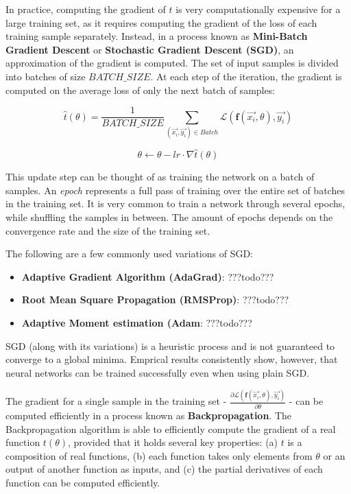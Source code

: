 In practice, computing the gradient of $t$ is very computationally expensive for a large training set, as it requires computing the gradient of the loss of each training sample separately. Instead, in a process known as \textbf{Mini-Batch Gradient Descent} or \textbf{Stochastic Gradient Descent (SGD)}, an approximation of the gradient is computed. The set of input samples is divided into batches of size $BATCH\_SIZE$. At each step of the iteration, the gradient is computed on the average loss of only the next batch of samples:

$$ \hat{t}(\theta) = \frac{1}{BATCH\_SIZE}\sum_{(\vec{x_i}, \vec{y_i}) \in Batch} \mathcal{L}(\textbf{f}(\vec{x_i}, \theta), \vec{y_i})  $$

$$ \theta \leftarrow \theta - \textit{lr} \cdot \nabla \hat{t}(\theta) $$

This update step can be thought of as training the network on a batch of samples. An \emph{epoch} represents a full pass of training over the entire set of batches in the training set. It is very common to train a network through several epochs, while shuffling the samples in between. The amount of epochs depends on the convergence rate and the size of the training set.

The following are a few commonly used variations of SGD:
\begin{itemize}
    \item \textbf{Adaptive Gradient Algorithm (AdaGrad)}: ???todo???
    \item \textbf{Root Mean Square Propagation (RMSProp)}: ???todo???
    \item \textbf{Adaptive Moment estimation (Adam}: ???todo???    
\end{itemize}

SGD (along with its variations) is a heuristic process and is not guaranteed to converge to a global minima. Emprical results consistently show, however, that neural networks can be trained successfully even when using plain SGD.

The gradient for a single sample in the training set -  $\frac{\partial \mathcal{L}(\textbf{f}(\vec{x_i}, \theta), \vec{y_i})}{\partial \theta}$ - can be computed efficiently in a process known as \textbf{Backpropagation}. The Backpropagation
algorithm is able to efficiently compute the gradient of a real function $t(\theta)$, provided that it holds several key properties: (a) $t$ is a composition of real functions, (b) each function takes only elements from $\theta$ or an output of another function as inputs, and (c) the partial derivatives of each function can be computed efficiently.  

